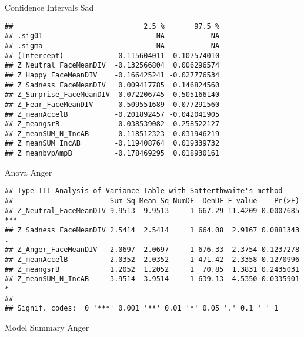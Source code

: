 \documentclass[
]{article}
\begin{document}
Confidence Intervals Sad

\begin{verbatim}
##                               2.5 %       97.5 %
## .sig01                           NA           NA
## .sigma                           NA           NA
## (Intercept)            -0.115604011  0.107574010
## Z_Neutral_FaceMeanDIV  -0.132566804  0.006296574
## Z_Happy_FaceMeanDIV    -0.166425241 -0.027776534
## Z_Sadness_FaceMeanDIV   0.009417785  0.146824560
## Z_Surprise_FaceMeanDIV  0.072206745  0.505166140
## Z_Fear_FaceMeanDIV     -0.509551689 -0.077291560
## Z_meanAccelB           -0.201892457 -0.042041905
## Z_meangsrB              0.038539082  0.258522127
## Z_meanSUM_N_IncAB      -0.118512323  0.031946219
## Z_meanSUM_IncAB        -0.119408764  0.019339732
## Z_meanbvpAmpB          -0.178469295  0.018930161
\end{verbatim}

Anova Anger

\begin{verbatim}
## Type III Analysis of Variance Table with Satterthwaite's method
##                       Sum Sq Mean Sq NumDF  DenDF F value    Pr(>F)    
## Z_Neutral_FaceMeanDIV 9.9513  9.9513     1 667.29 11.4209 0.0007685 ***
## Z_Sadness_FaceMeanDIV 2.5414  2.5414     1 664.08  2.9167 0.0881343 .  
## Z_Anger_FaceMeanDIV   2.0697  2.0697     1 676.33  2.3754 0.1237278    
## Z_meanAccelB          2.0352  2.0352     1 471.42  2.3358 0.1270996    
## Z_meangsrB            1.2052  1.2052     1  70.85  1.3831 0.2435031    
## Z_meanSUM_N_IncAB     3.9514  3.9514     1 639.13  4.5350 0.0335901 *  
## ---
## Signif. codes:  0 '***' 0.001 '**' 0.01 '*' 0.05 '.' 0.1 ' ' 1
\end{verbatim}

Model Summary Anger
\end{document}
